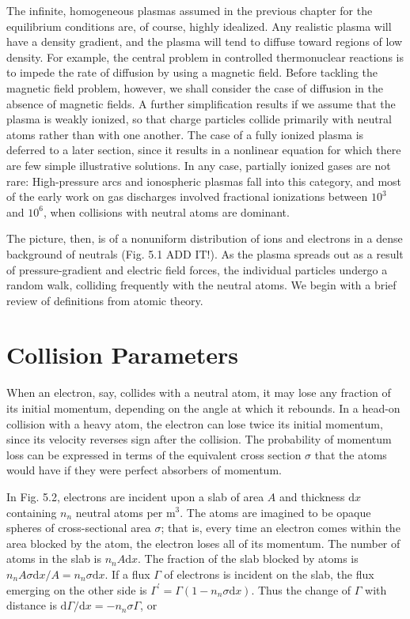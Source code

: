 \documentclass[
  notoc %
]{tufte-book}
\begin{document}
The infinite, homogeneous plasmas assumed in the previous chapter for
the equilibrium conditions are, of course, highly idealized. Any
realistic plasma will have a density gradient, and the plasma will tend
to diffuse toward regions of low density. For example, the central
problem in controlled thermonuclear reactions is to impede the rate of
diffusion by using a magnetic field. Before tackling the magnetic field
problem, however, we shall consider the case of diffusion in the absence
of magnetic fields. A further simplification results if we assume that
the plasma is weakly ionized, so that charge particles collide primarily
with neutral atoms rather than with one another. The case of a fully
ionized plasma is deferred to a later section, since it results in a
nonlinear equation for which there are few simple illustrative
solutions. In any case, partially ionized gases are not rare:
High-pressure arcs and ionospheric plasmas fall into this category, and
most of the early work on gas discharges involved fractional ionizations
between \(10^3\) and \(10^6\), when collisions with neutral atoms are
dominant.

The picture, then, is of a nonuniform distribution of ions and electrons
in a dense background of neutrals (Fig. 5.1 ADD IT!). As the plasma
spreads out as a result of pressure-gradient and electric field forces,
the individual particles undergo a random walk, colliding frequently
with the neutral atoms. We begin with a brief review of definitions from
atomic theory.

\hypertarget{collision-parameters}{%
\section{Collision Parameters}\label{collision-parameters}}

When an electron, say, collides with a neutral atom, it may lose any
fraction of its initial momentum, depending on the angle at which it
rebounds. In a head-on collision with a heavy atom, the electron can
lose twice its initial momentum, since its velocity reverses sign after
the collision. The probability of momentum loss can be expressed in
terms of the equivalent cross section \(\sigma\) that the atoms would
have if they were perfect absorbers of momentum.

In Fig. 5.2, electrons are incident upon a slab of area \(A\) and
thickness \(\mathrm{d}x\) containing \(n_n\) neutral atoms per
\(\text{m}^3\). The atoms are imagined to be opaque spheres of
cross-sectional area \(\sigma\); that is, every time an electron comes
within the area blocked by the atom, the electron loses all of its
momentum. The number of atoms in the slab is \(n_n A \mathrm{d}x\). The
fraction of the slab blocked by atoms is
\(n_n A\sigma \mathrm{d}x / A = n_n \sigma \mathrm{d}x\). If a flux
\(\Gamma\) of electrons is incident on the slab, the flux emerging on
the other side is \(\Gamma^\prime = \Gamma(1-n_n \sigma \mathrm{d}x)\).
Thus the change of \(\Gamma\) with distance is
\(\mathrm{d}\Gamma/\mathrm{d}x = -n_n \sigma\Gamma\), or
\end{document}
